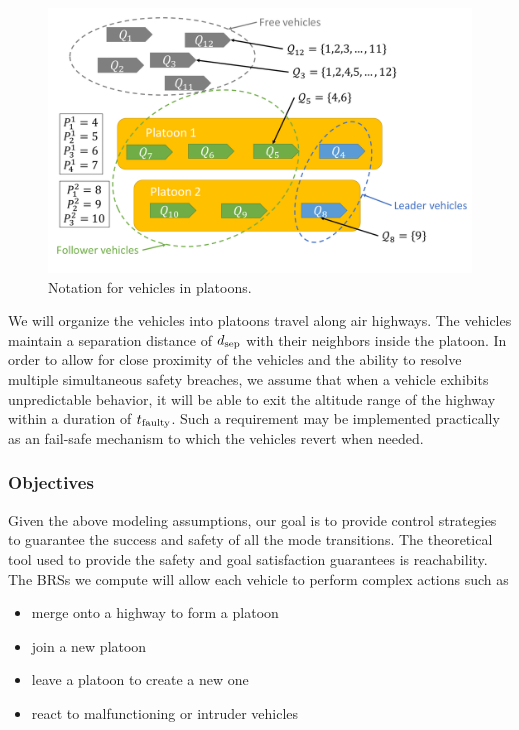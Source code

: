 \begin{figure}
	\centering
	\includegraphics[width=\columnwidth]{"fig/vehicleNotation"}
	\caption{Notation for vehicles in platoons.}
	\label{fig:vehicleNotation}
\end{figure}

We will organize the vehicles into platoons travel along air highways. The vehicles maintain a separation distance of $d_\text{sep}$ with their neighbors inside the platoon. In order to allow for close proximity of the vehicles and the ability to resolve multiple simultaneous safety breaches, we assume that when a vehicle exhibits unpredictable behavior, it will be able to exit the altitude range of the highway within a duration of $t_\text{faulty}$. Such a requirement may be implemented practically as an fail-safe mechanism to which the vehicles revert when needed.

\subsubsection{Objectives}
Given the above modeling assumptions, our goal is to provide control strategies to guarantee the success and safety of all the mode transitions. The theoretical tool used to provide the safety and goal satisfaction guarantees is reachability. The BRSs we compute will allow each vehicle to perform complex actions such as 


\begin{itemize}
\item merge onto a highway to form a platoon
\item join a new platoon
\item leave a platoon to create a new one
\item react to malfunctioning or intruder vehicles
\end{itemize}

